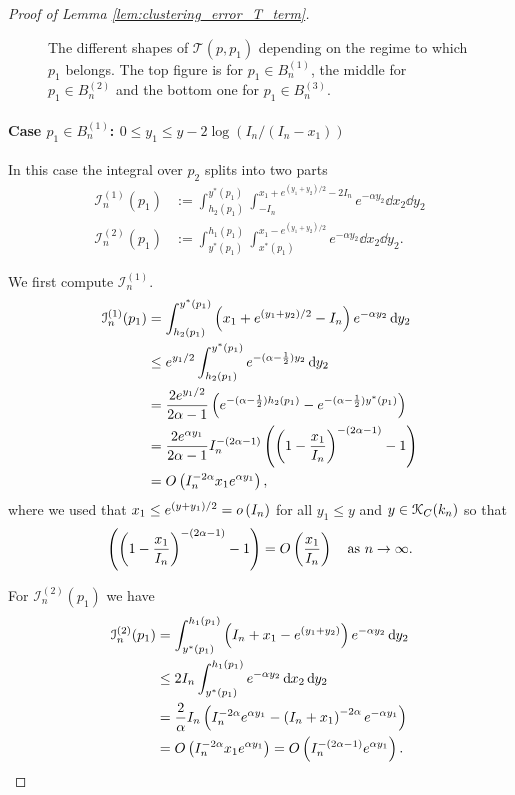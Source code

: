 \begin{proof}[Proof of Lemma \ref{lem:clustering_error_T_term}]
\begin{figure}[!tp]
\begin{tikzpicture}[scale=5]
\end{tikzpicture}
\caption{The different shapes of $\mathcal{T}(p,p_1)$ depending on the regime to which $p_1$ belongs. The top figure is for $p_1 \in B_n^{(1)}$, the middle for $p_1 \in B_n^{(2)}$ and the bottom one for $p_1 \in B_n^{(3)}$.}
\label{fig:shapes_triangle_mismatches}
\end{figure}

\paragraph{Case $p_1 \in B_n^{(1)}$: $0 \le y_1 \le y - 2\log(I_n/(I_n-x_1))$}

In this case the integral over $p_2$ splits into two parts
\begin{align*}
	\mathcal{I}_n^{(1)}(p_1) &:= \int_{h_2(p_1)}^{y^\ast(p_1)} \int_{-I_n}^{x_1 + e^{(y_1+y_2)/2}-2I_n} e^{-\alpha y_2}
		\dd x_2 \dd y_2\\
	\mathcal{I}_n^{(2)}(p_1) &:= \int_{y^\ast(p_1)}^{h_1(p_1)} \int_{x^\ast(p_1)}^{x_1 - e^{(y_1+y_2)/2}} e^{-\alpha y_2}
		\dd x_2 \dd y_2.
\end{align*}

We first compute $\mathcal{I}_n^{(1)}$.
\begin{align*}
	\mathcal{I}_n^{(1)}(p_1) &= \int_{h_2(p_1)}^{y^\ast(p_1)} \left(x_1 + e^{(y_1+y_2)/2} - I_n\right) e^{-\alpha y_2} 
		\dd y_2\\
	&\le e^{y_1/2} \int_{h_2(p_1)}^{y^\ast(p_1)} e^{-(\alpha-\frac{1}{2}) y_2} \dd y_2\\
	&= \frac{2 e^{y_1/2}}{2\alpha - 1} \left(e^{-(\alpha-\frac{1}{2})h_2(p_1)} - e^{-(\alpha-\frac{1}{2})y^\ast(p_1)}
		\right) \\
	&= \frac{2 e^{\alpha y_1}}{2\alpha - 1} I_n^{-(2\alpha -1)}\left(\left(1 - \frac{x_1}{I_n}\right)^{-(2\alpha - 1)}-1\right)\\
	&= \bigO{I_n^{-2\alpha} x_1 e^{\alpha y_1}},
\end{align*}
where we used that $x_1 \le e^{(y+y_1)/2} = \smallO{I_n}$ for all $y_1\le y$ and $y \in \Kcal_{C}(k_n)$ so that
\[
	\left(\left(1 - \frac{x_1}{I_n}\right)^{-(2\alpha - 1)}-1\right) = \bigO{\frac{x_1}{I_n}} \quad 
	\text{as } n \to \infty.
\]

For $\mathcal{I}_n^{(2)}(p_1)$ we have
\begin{align*}
	\mathcal{I}_n^{(2)}(p_1) &= \int_{y^\ast(p_1)}^{h_1(p_1)} \left(I_n + x_1 - e^{(y_1+y_2)}\right) e^{-\alpha y_2}
		\dd y_2\\
	&\le 2 I_n \int_{y^\ast(p_1)}^{h_1(p_1)} e^{-\alpha y_2} \dd x_2 \dd y_2\\
	&= \frac{2}{\alpha} I_n \left(I_n^{-2\alpha}e^{\alpha y_1} - \left(I_n + x_1\right)^{-2\alpha} e^{-\alpha y_1}\right)\\
	&= \bigO{I_n^{-2\alpha} x_1 e^{\alpha y_1}} = \bigO{I_n^{-(2\alpha - 1)} e^{\alpha y_1}}.
\end{align*}


\end{proof}
